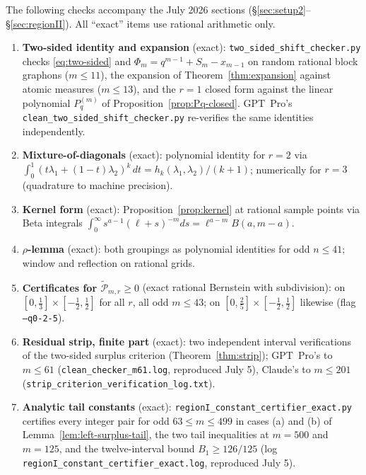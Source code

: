 \documentclass[11pt]{article}
\newcommand{\wtP}{\widetilde{\mathcal P}}
\begin{document}
The following checks accompany the July 2026 sections (\S\ref{sec:setup2}--\S\ref{sec:regionII}).  All ``exact'' items use
rational arithmetic only.

\begin{enumerate}[label=\textup{(\arabic*)},resume]
    \item \textbf{Two-sided identity and expansion} (exact):
    \texttt{two\_sided\_shift\_checker.py} checks
    \eqref{eq:two-sided} and $\Phi_m=q^{m-1}+S_m-x_{m-1}$ on random rational
    block graphons ($m\le11$), the expansion of Theorem~\ref{thm:expansion}
    against atomic measures ($m\le13$), and the $r=1$ closed form against the
    linear polynomial $P^{(m)}_q$ of Proposition~\ref{prop:Pq-closed}.
    GPT~Pro's \texttt{clean\_two\_sided\_shift\_checker.py} re-verifies the
    same identities independently.
    \item \textbf{Mixture-of-diagonals} (exact): polynomial identity for
    $r=2$ via $\int_0^1(t\lambda_1+(1-t)\lambda_2)^k\,dt=h_k(\lambda_1,\lambda_2)/(k+1)$;
    numerically for $r=3$ (quadrature to machine precision).
    \item \textbf{Kernel form} (exact): Proposition~\ref{prop:kernel} at
    rational sample points via Beta integrals
    $\int_0^\infty s^{a-1}(\ell+s)^{-m}ds=\ell^{a-m}B(a,m-a)$.
    \item \textbf{$\rho$-lemma} (exact): both groupings as polynomial
    identities for odd $n\le41$; window and reflection on rational grids.
    \item \textbf{Certificates for $\wtP_{m,r}\ge0$} (exact rational
    Bernstein with subdivision): on $[0,\tfrac13]\times[-\tfrac12,\tfrac12]$
    for all $r$, all odd $m\le43$; on $[0,\tfrac25]\times[-\tfrac12,\tfrac12]$
    likewise (flag \texttt{--q0-2-5}).
    \item \textbf{Residual strip, finite part} (exact): two independent
    interval verifications of the two-sided surplus criterion
    (Theorem~\ref{thm:strip}); GPT~Pro's to $m\le61$
    (\texttt{clean\_checker\_m61.log}, reproduced July 5), Claude's to
    $m\le201$ (\texttt{strip\_criterion\_verification\_log.txt}).
    \item \textbf{Analytic tail constants} (exact):
    \texttt{regionI\_constant\_certifier\_exact.py} certifies every integer
    pair for odd $63\le m\le499$ in cases (a) and (b) of
    Lemma~\ref{lem:left-surplus-tail}, the two tail inequalities at $m=500$
    and $m=125$, and the twelve-interval bound $B_1\ge126/125$
    (log \texttt{regionI\_constant\_certifier\_exact.log}, reproduced July 5).

\end{enumerate}
\end{document}
